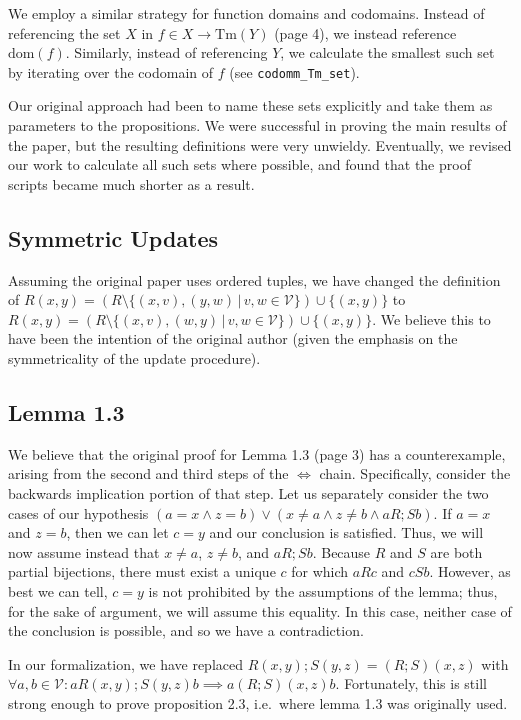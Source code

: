 \documentclass{article}
\begin{document}
We employ a similar strategy for function domains and codomains. Instead of referencing the set $X$
in $f \in X \longrightarrow \textrm{Tm}(Y)$ (page 4), we instead reference $\textrm{dom}(f)$.
Similarly, instead of referencing $Y$, we calculate the smallest such set by iterating over the
codomain of $f$ (see \verb|codomm_Tm_set|).

Our original approach had been to name these sets explicitly and take them as parameters to the
propositions. We were successful in proving the main results of the paper, but the resulting
definitions were very unwieldy. Eventually, we revised our work to calculate all such sets where
possible, and found that the proof scripts became much shorter as a result.

\subsection{Symmetric Updates}

Assuming the original paper uses ordered tuples, we have changed the definition of $R(x,y) = (R
\setminus \{ (x,v),(y,w) \, | \, v,w \in \mathcal{V} \}) \cup \{ (x,y) \}$ to $R(x,y) = (R \setminus
\{ (x,v),(w,y) \, | \, v,w \in \mathcal{V} \}) \cup \{ (x,y) \}$. We believe this to have been the
intention of the original author (given the emphasis on the symmetricality of the update procedure).

\subsection{Lemma 1.3}

We believe that the original proof for Lemma 1.3 (page 3) has a counterexample, arising from the
second and third steps of the $\iff$ chain. Specifically, consider the backwards implication portion
of that step. Let us separately consider the two cases of our hypothesis $(a = x \land z = b) \lor
(x \neq a \land z \neq b \land a R; S b)$. If $a = x$ and $z = b$, then we can let $c = y$ and our
conclusion is satisfied. Thus, we will now assume instead that $x \neq a$, $z \neq b$, and $a R; S
b$. Because $R$ and $S$ are both partial bijections, there must exist a unique $c$ for which $aRc$
and $cSb$. However, as best we can tell, $c = y$ is not prohibited by the assumptions of the lemma;
thus, for the sake of argument, we will assume this equality. In this case, neither case of the
conclusion is possible, and so we have a contradiction.

In our formalization, we have replaced $R(x,y); S(y,z) = (R;S)(x,z)$ with $\forall a, b \in
\mathcal{V} : a R(x,y); S(y,z) b \implies a (R;S)(x,z) b$. Fortunately, this is still strong enough
to prove proposition 2.3, i.e.\ where lemma 1.3 was originally used.
\end{document}
